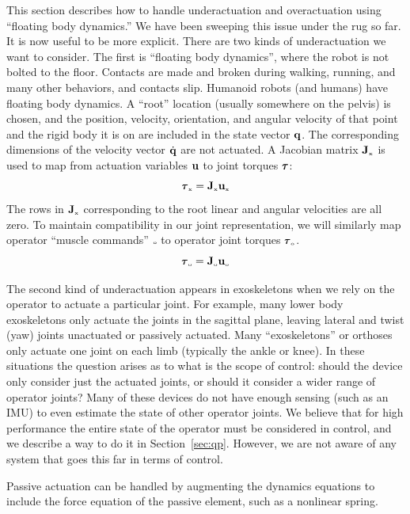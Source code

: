 \documentclass[letterpaper,12pt,fullpage]{article}
\newcommand{\myo}{{\mbox {\tiny o}}}
\newcommand{\myx}{{\mbox {\tiny x}}}
\begin{document}
This section describes how to handle underactuation and overactuation using
``floating body dynamics.''
We have been sweeping this
issue under the rug so far. It is now useful to be more explicit.
There are two kinds of underactuation we want to consider. The first
is ``floating body dynamics'', where the robot is not bolted to the floor.
Contacts are made and broken during walking, running, and many other behaviors,
and contacts slip.
Humanoid robots (and humans) have floating body dynamics.
A ``root'' location (usually somewhere
on the pelvis) is chosen, and the position, velocity, orientation, and angular
velocity of that point and the rigid body it is on
are included in the state vector ${\bf q}$. The corresponding dimensions of the
velocity vector $\dot{{\bf q}}$ are not actuated. A Jacobian matrix
$\mJ_{\myx}$ is used to map from actuation variables ${\bf u}$ to joint torques $\vtau$:
\begin{equation}
\vtau_{\myx} = \mJ_{\myx} \vu_{\myx}
\end{equation}
The rows in $\mJ_{\myx}$ corresponding to the root linear and angular velocities
are all zero.
To maintain compatibility in our joint representation, we will similarly
map operator ``muscle commands'' $\myo$ to operator joint torques $\vtau_{\myo}$.
\begin{equation}
\vtau_{\myo} = \mJ_{\myo} \vu_{\myo}
\end{equation}

The second kind of underactuation appears in exoskeletons when we rely on the
operator to actuate a particular joint. For example, many lower body
exoskeletons only actuate the joints in the sagittal plane, leaving lateral
and twist (yaw) joints unactuated or passively actuated. 
Many ``exoskeletons'' or orthoses only actuate one joint on each limb (typically
the ankle or knee). In these situations the question arises as to what is
the scope of control: should the device only consider
just the actuated joints,
or should it consider a wider range of operator joints? Many of these devices
do not have enough sensing (such as an IMU) to even estimate the state of other
operator joints. We believe that for high performance the entire state of the
operator must be considered in control, and we describe a way to do it in
Section~\ref{sec:qp}.
However, we are not aware of any system that goes this far in terms of control.

Passive actuation can be handled by augmenting the
dynamics equations to include the force equation of the passive element,
such as a nonlinear spring.
\end{document}
